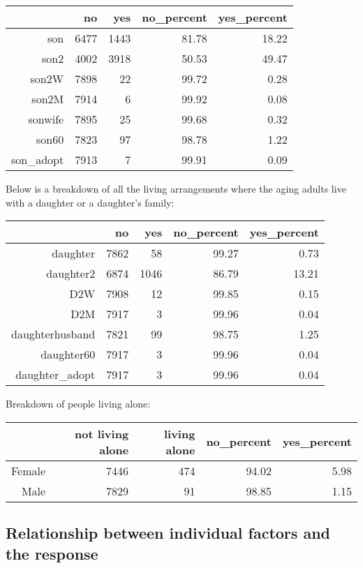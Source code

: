 \documentclass[11pt]{article}
\begin{document}
\begin{table}[ht]
\centering
\begin{tabular}{rrrrr}
  \hline
 & no & yes & no\_percent & yes\_percent \\ 
  \hline
son & 6477 & 1443 & 81.78 & 18.22 \\ 
  son2 & 4002 & 3918 & 50.53 & 49.47 \\ 
  son2W & 7898 & 22 & 99.72 & 0.28 \\ 
  son2M & 7914 & 6 & 99.92 & 0.08 \\ 
  sonwife & 7895 & 25 & 99.68 & 0.32 \\ 
  son60 & 7823 & 97 & 98.78 & 1.22 \\ 
  son\_adopt & 7913 & 7 & 99.91 & 0.09 \\ 
   \hline
\end{tabular}
\end{table}\newline
Below is a breakdown of all the living arrangements where the aging adults live with a daughter or a daughter's family:\\
\begin{table}[H]
\centering
\begin{tabular}{rrrrr}
  \hline
 & no & yes & no\_percent & yes\_percent \\ 
  \hline
daughter & 7862 & 58 & 99.27 & 0.73 \\ 
  daughter2 & 6874 & 1046 & 86.79 & 13.21 \\ 
  D2W & 7908 & 12 & 99.85 & 0.15 \\ 
  D2M & 7917 & 3 & 99.96 & 0.04 \\ 
  daughterhusband & 7821 & 99 & 98.75 & 1.25 \\ 
  daughter60 & 7917 & 3 & 99.96 & 0.04 \\ 
  daughter\_adopt & 7917 & 3 & 99.96 & 0.04 \\ 
   \hline
\end{tabular}
\end{table}\newline
Breakdown of people living alone:
\begin{table}[H]
\centering
\begin{tabular}{rrrrr}
  \hline
 & not living alone & living alone & no\_percent & yes\_percent \\ 
  \hline
Female & 7446 & 474 & 94.02 & 5.98 \\ 
  Male & 7829 & 91 & 98.85 & 1.15 \\ 
   \hline
\end{tabular}
\end{table}\subsection*{Relationship between individual factors and the response}
\end{document}
